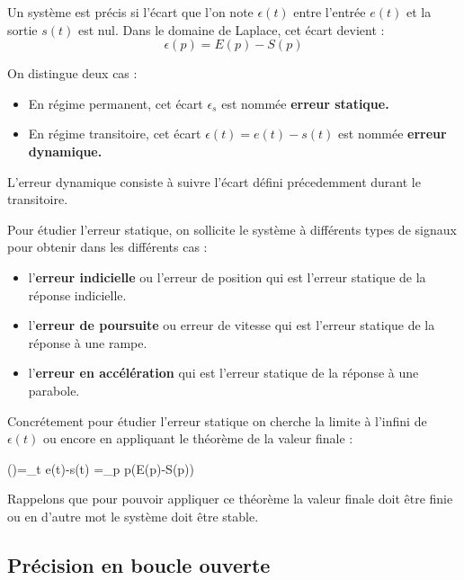 Un système est précis si l'écart que l'on note $\epsilon(t)$ 
entre l'entrée $e(t)$ et la sortie $s(t)$ est nul.
Dans le domaine de Laplace, cet écart devient :
$$
\epsilon(p)=E(p)-S(p)
$$

On distingue deux cas :
\begin{itemize}
    \item En régime permanent, cet écart $\epsilon_s$ est nommée 
		  \textbf{erreur statique. }
    \item En régime transitoire, cet écart $\epsilon(t)=e(t)-s(t)$ est 
		  nommée \textbf{erreur dynamique.}
\end{itemize}

L'erreur dynamique consiste à suivre l'écart défini précedemment durant 
le transitoire.

Pour étudier l'erreur statique, on sollicite le système à différents 
types de signaux pour obtenir dans les différents cas :
\begin{itemize}
	\item l'\textbf{erreur indicielle} ou l'erreur de position qui est 
		  l'erreur statique de la réponse indicielle.
	\item l'\textbf{erreur de poursuite} ou erreur de vitesse qui est 
		  l'erreur statique de la réponse à une rampe.
	\item l'\textbf{erreur en accélération} qui est l'erreur statique 
		  de la réponse à une parabole.
\end{itemize}
Concrétement pour étudier l'erreur statique on cherche la limite à l'infini 
de $\epsilon(t)$ ou encore en appliquant le théorème de la valeur finale :
\begin{bequation}
\epsilon(\infty)=\lim\limits_{t\to\infty} e(t)-s(t)
	            =\lim\limits_{p} p\big(E(p)-S(p)\big)
\end{bequation}
Rappelons que pour pouvoir appliquer ce théorème la valeur finale doit 
être finie ou en d'autre mot le système doit être stable.

\subsection{Précision en boucle ouverte}

